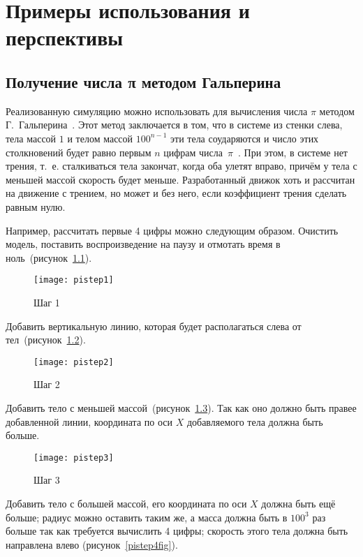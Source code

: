 \chapter{Примеры использования и перспективы}\label{chapter-usage}

\section{Получение числа π методом Гальперина}\label{pipool}

Реализованную симуляцию можно использовать для вычисления числа \(\pi\)
методом Г.~Гальперина~\cite{poolpi}.
Этот метод заключается в том, что в системе из стенки слева,
тела массой \(1\) и телом массой \(100^{n - 1}\) эти тела соударяются и число этих столкновений
будет равно первым \(n\) цифрам числа~\(\pi\)~\cite{habrpi}.
При этом, в системе нет трения, т.~е. сталкиваться тела закончат, когда оба улетят вправо, причём у тела с меньшей массой скорость будет меньше.
Разработанный движок хоть и рассчитан на движение с трением, но может и без него, если коэффициент трения сделать равным нулю.

Например, рассчитать первые 4 цифры можно следующим образом.
Очистить модель, поставить воспроизведение на паузу и отмотать время в ноль~(рисунок~\ref{pistep1fig}).

\begin{figure}[H]
    \centering
    \texttt{[image: pistep1]}
    \caption{Шаг 1\label{pistep1fig}}
\end{figure}

Добавить вертикальную линию, которая будет располагаться слева от тел~(рисунок~\ref{pistep2fig}).

\begin{figure}[H]
    \centering
    \texttt{[image: pistep2]}
    \caption{Шаг 2\label{pistep2fig}}
\end{figure}

Добавить тело с меньшей массой~(рисунок~\ref{pistep3fig}).
Так как оно должно быть правее добавленной линии, координата по оси \(X\)
добавляемого тела должна быть больше.

\begin{figure}[H]
    \centering
    \texttt{[image: pistep3]}
    \caption{Шаг 3\label{pistep3fig}}
\end{figure}

Добавить тело с большей массой, его координата по оси \(X\) должна быть ещё больше;
радиус можно оставить таким же, а масса должна быть в \(100^3\) раз больше так как требуется вычислить 4 цифры;
скорость этого тела должна быть направлена влево (рисунок~\ref{pistep4fig}).

